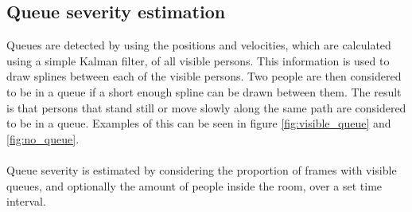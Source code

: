 \newpage

\subsection{Queue severity estimation}
Queues are detected by using the positions and velocities, which are calculated using a simple Kalman filter, of all visible persons. This information is used to draw splines between each of the visible persons. Two people are then considered to be in a queue if a short enough spline can be drawn between them. The result is that persons that stand still or move slowly along the same path are considered to be in a queue. Examples of this can be seen in figure \ref{fig:visible_queue} and \ref{fig:no_queue}.
\\ \\
Queue severity is estimated by considering the proportion of frames with visible queues, and optionally the amount of people inside the room, over a set time interval. 
